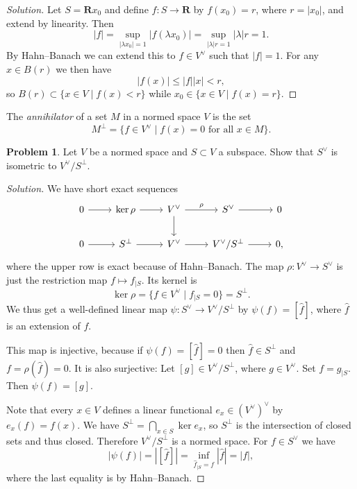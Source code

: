 \documentclass[11pt]{article}
\theoremstyle{definition}
\newtheorem{prob}{Problem}
\newcommand{\kk}[1]{\mathbf{#1}}
\begin{document}
\begin{proof}[Solution]
Let $S = \kk R x_0$ and define $f : S \to \kk R$ by $f(x_0) = r$,
where $r = |x_0|$, and extend by linearity.
Then
\[
|f|
= \sup_{|\lambda x_0| = 1} |f(\lambda x_0)|
= \sup_{|\lambda| r = 1} |\lambda| r
= 1.
\]
By Hahn--Banach we can extend this to $f \in V^\vee$ such that $|f| = 1$.
For any $x \in B(r)$ we then have
\[
|f(x)| \leq |f| |x| < r,
\]
so $B(r) \subset \{ x \in V \mid f(x) < r \}$ while
$x_0 \in \{ x \in V \mid f(x) = r \}$.
\end{proof}

The \emph{annihilator} of a set $M$ in a normed space $V$ is the set
\[
M^{\perp} = \{ f \in V^\vee \mid \text{$f(x) = 0$ for all $x \in M$} \}.
\]

\begin{prob}
Let $V$ be a normed space and $S \subset V$ a subspace.
Show that $S^\vee$ is isometric to $V^\vee / S^\perp$.
\end{prob}

\begin{proof}[Solution]
We have short exact sequences
\[
\begin{tikzcd}
0 \ar[r] & \ker \rho \ar[r] & V^\vee \ar[d] \ar[r,"\rho"] & S^\vee \ar[r] & 0
\\
0 \ar[r] & S^\perp \ar[r] & V^\vee \ar[r] & V^\vee / S^\perp \ar[r] & 0,
\end{tikzcd}
\]
where the upper row is exact because of Hahn--Banach.
The map $\rho : V^\vee \to S^\vee$ is just the restriction map $f \mapsto f_{|S}$.
Its kernel is
\[
\ker \rho
= \{ f \in V^\vee \mid f_{|S} = 0 \}
= S^\perp.
\]
We thus get a well-defined linear map $\psi : S^\vee \to V^\vee / S^\perp$
by $\psi(f) = [\hat f]$, where $\hat f$ is an extension of $f$.

This map is injective, because if $\psi(f) = [ \hat f ] = 0$ then $\hat f \in
S^\perp$ and $f = \rho(\hat f) = 0$.
It is also surjective: Let $[g] \in V^\vee / S^\perp$, where $g \in V^\vee$.
Set $f = g_{|S}$. Then $\psi(f) = [g]$.

Note that every $x \in V$ defines a linear functional $e_x \in (V^\vee)^\vee$
by $e_x(f) = f(x)$.
We have $S^\perp = \bigcap_{x \in S} \ker e_x$, so $S^\perp$ is the intersection
of closed sets and thus closed.
Therefore $V^\vee / S^\perp$ is a normed space.
For $f \in S^\vee$ we have
\[
|\psi(f)|
= |[ \hat f ]|
= \inf_{\hat f_{|S} = f} |\hat f|
= |f|,
\]
where the last equality is by Hahn--Banach.
\end{proof}
\end{document}

